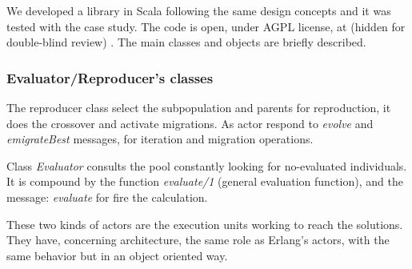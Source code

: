 
We developed a library in Scala following the same design concepts and it was tested with the case study. The code is open, under AGPL license, at
(hidden for double-blind review)
. The main classes and objects are briefly described.

\subsubsection{Evaluator/Reproducer's classes}

The reproducer class select the subpopulation and parents for reproduction, it does the crossover and activate migrations. As actor respond to {\em evolve} and {\em emigrateBest} messages, for iteration and migration operations.

Class {\em Evaluator} consults the pool constantly looking for no-evaluated individuals. It is compound by the function {\em evaluate/1} (general evaluation function), and the message: {\em evaluate} for fire the calculation.

These two kinds of actors are the execution units working to reach the solutions. They have, concerning architecture, the same role as Erlang’s actors, with the same behavior but in an object oriented way.
